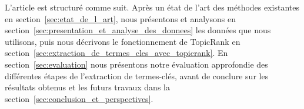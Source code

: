   L'article est structuré comme suit. Après un état de l'art des méthodes
  existantes en section~\ref{sec:etat_de_l_art}, nous présentons et analysons en
  section~\ref{sec:presentation_et_analyse_des_donnees} les données que nous
  utilisons, puis nous décrivons le fonctionnement de TopicRank en
  section~\ref{sec:extraction_de_termes_cles_avec_topicrank}. En
  section~\ref{sec:evaluation} nous présentons notre évaluation approfondie des
  différentes étapes de l'extraction de termes-clés, avant de conclure sur les
  résultats obtenus et les futurs travaux dans la
  section~\ref{sec:conclusion_et_perspectives}.

